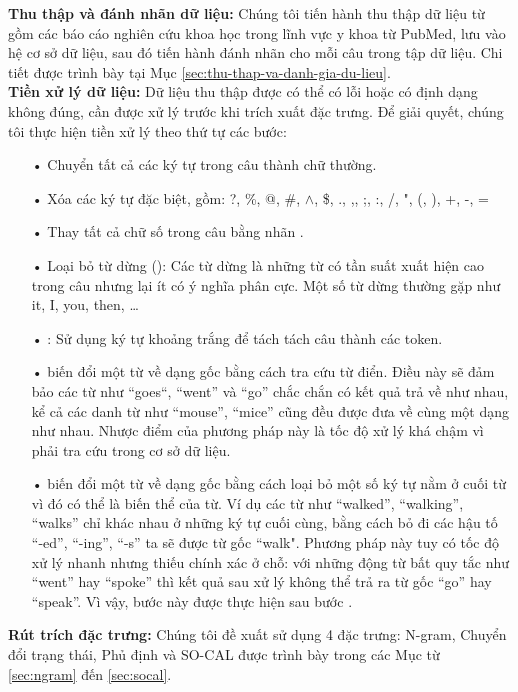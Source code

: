 \textbf{Thu thập và đánh nhãn dữ liệu:} Chúng tôi tiến hành thu thập dữ liệu từ gồm các báo cáo nghiên cứu khoa học trong lĩnh vực y khoa từ PubMed, lưu vào hệ cơ sở dữ liệu, sau đó tiến hành đánh nhãn cho mỗi câu trong tập dữ liệu. Chi tiết được trình bày tại Mục \ref{sec:thu-thap-va-danh-gia-du-lieu}.\\

\textbf{Tiền xử lý dữ liệu:} Dữ liệu thu thập được có thể có lỗi hoặc có định dạng không đúng, cần được xử lý trước khi trích xuất đặc trưng. Để giải quyết, chúng tôi thực hiện tiền xử lý theo thứ tự các bước:
\begin{itemize}
\item[•] Chuyển tất cả các ký tự trong câu thành chữ thường.
\item[•] Xóa các ký tự đặc biệt, gồm: ?, \%, @, \#, $\wedge$, \$, ., ,,  ;, :, /, ", (, ), +, -, =
\item[•] Thay tất cả chữ số trong câu bằng nhãn .
\item[•] Loại bỏ từ dừng (): Các từ dừng là những từ có tần suất xuất hiện cao trong câu nhưng lại ít có ý nghĩa phân cực. Một số từ dừng thường gặp như it, I, you, then, \ldots
\item[•] : Sử dụng ký tự khoảng trắng để tách tách câu thành các token.
\item[•]  biến đổi một từ về dạng gốc bằng cách tra cứu từ điển.  Điều này sẽ đảm bảo các từ như “goes“, “went” và “go” chắc chắn có kết quả trả về  như nhau, kể cả các danh từ như ``mouse'', ``mice'' cũng đều được đưa về cùng một dạng như nhau. Nhược điểm của phương pháp này là tốc độ xử lý khá chậm vì phải tra cứu trong cơ sở dữ liệu.
\item[•]  biến đổi một từ về dạng gốc bằng cách loại bỏ một số ký tự nằm ở cuối từ vì đó có thể là biến thể của từ. Ví dụ các từ như ``walked'', ``walking'', ``walks'' chỉ khác nhau ở những ký tự cuối cùng, bằng cách bỏ đi các hậu tố ``-ed'', ``-ing'', ``-s'' ta sẽ được từ gốc ``walk". Phương pháp này tuy có tốc độ xử lý nhanh nhưng thiếu chính xác ở chỗ: với những động từ bất quy tắc như ``went'' hay ``spoke'' thì kết quả sau xử lý không thể trả ra từ gốc ``go'' hay ``speak''. Vì vậy, bước này được thực hiện sau bước .
\end{itemize}
\textbf{Rút trích đặc trưng:} Chúng tôi đề xuất sử dụng 4 đặc trưng: N-gram, Chuyển đổi trạng thái, Phủ định và SO-CAL được trình bày trong các Mục từ \ref{sec:ngram} đến \ref{sec:socal}. \\

